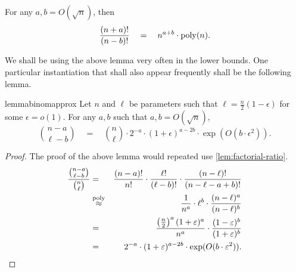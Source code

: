 \begin{lemma}{\cite[Lemma 6]{gkks13}}\label{lem:factorial-ratio} For any $a,b = O(\sqrt{n})$, then
\[
\frac{(n+a)!}{(n-b)!}\quad=\quad n^{a + b} \cdot \operatorname{poly}(n).
\]
\end{lemma}

We shall be using the above lemma very often in the lower bounds. 
One particular instantiation that shall also appear frequently shall be the following lemma.  

\begin{restatable}{lemma}{binomapprox}\label{lem:binom-approx}
Let $n$ and $\ell$ be parameters such that $\ell = \frac{n}{2}(1 - \epsilon)$ for some $\epsilon = o(1)$. 
For any $a, b$ such that $a,b = O(\sqrt{n})$, 
\[
\binom{n - a}{\ell - b} \quad = \quad \binom{n}{\ell} \cdot 2^{-a} \cdot (1+\epsilon)^{a-2b} \cdot \exp(O(b\cdot \epsilon^2)).
\]
\end{restatable}
\begin{proof}
The proof of the above lemma would repeated use \autoref{lem:factorial-ratio}. 
\begin{eqnarray*}
\frac{\binom{n-a}{\ell -b}}{\binom{n}{\ell}} & = & \frac{(n-a)!}{n!} \cdot \frac{\ell!}{(\ell -b)!}\cdot \frac{(n-\ell)!}{(n-\ell-a+b)!}\\
& \stackrel{\operatorname{poly}}{\approx}& \frac{1}{n^a} \cdot \ell^b \cdot \frac{(n-\ell)^a}{(n-\ell)^b}\\
& = & \frac{\left(\frac{n}{2}\right)^a(1 +\varepsilon)^a}{n^a} \cdot \frac{(1-\varepsilon)^{b}}{(1+\varepsilon)^b}\\
& = & 2^{-a} \cdot (1+\varepsilon)^{a - 2b} \cdot \exp(O(b\cdot \varepsilon^2)). \qedhere
\end{eqnarray*}
\end{proof}


